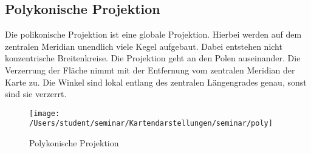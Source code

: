 \subsection{Polykonische Projektion}
\label{sec:polikonisch}
Die polikonische Projektion ist eine globale Projektion. Hierbei werden auf dem zentralen Meridian unendlich viele Kegel aufgebaut. Dabei entstehen nicht konzentrische Breitenkreise. Die Projektion geht an den Polen auseinander. Die Verzerrung der Fläche nimmt mit der Entfernung vom zentralen Meridian der Karte zu. Die Winkel sind lokal entlang des zentralen Längengrades genau, sonst sind sie verzerrt.\\

\begin{figure}[hbtp]
\centering
\texttt{[image: /Users/student/seminar/Kartendarstellungen/seminar/poly]} \caption{Polykonische Projektion}
\end{figure}
\newpage 